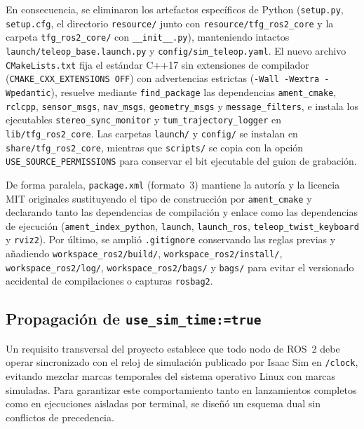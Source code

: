 En consecuencia, se eliminaron los artefactos específicos de Python (\texttt{setup.py}, \texttt{setup.cfg}, el directorio \texttt{resource/} junto con \texttt{resource/tfg\_ros2\_core} y la carpeta \texttt{tfg\_ros2\_core/} con \texttt{\_\_init\_\_.py}), manteniendo intactos \texttt{launch/teleop\_base.launch.py} y \texttt{config/sim\_teleop.yaml}. El nuevo archivo \texttt{CMakeLists.txt} fija el estándar C++17 sin extensiones de compilador (\texttt{CMAKE\_CXX\_EXTENSIONS OFF}) con advertencias estrictas (\texttt{-Wall -Wextra -Wpedantic}), resuelve mediante \texttt{find\_package} las dependencias \texttt{ament\_cmake}, \texttt{rclcpp}, \texttt{sensor\_msgs}, \texttt{nav\_msgs}, \texttt{geometry\_msgs} y \texttt{message\_filters}, e instala los ejecutables \texttt{stereo\_sync\_monitor} y \texttt{tum\_trajectory\_logger} en \texttt{lib/tfg\_ros2\_core}. Las carpetas \texttt{launch/} y \texttt{config/} se instalan en \texttt{share/tfg\_ros2\_core}, mientras que \texttt{scripts/} se copia con la opción \texttt{USE\_SOURCE\_PERMISSIONS} para conservar el bit ejecutable del guion de grabación.

De forma paralela, \texttt{package.xml} (formato~\num{3}) mantiene la autoría y la licencia MIT originales sustituyendo el tipo de construcción por \texttt{ament\_cmake} y declarando tanto las dependencias de compilación y enlace como las dependencias de ejecución (\texttt{ament\_index\_python}, \texttt{launch}, \texttt{launch\_ros}, \texttt{teleop\_twist\_keyboard} y \texttt{rviz2}). Por último, se amplió \texttt{.gitignore} conservando las reglas previas y añadiendo \texttt{workspace\_ros2/build/}, \texttt{workspace\_ros2/install/}, \texttt{workspace\_ros2/log/}, \texttt{workspace\_ros2/bags/} y \texttt{bags/} para evitar el versionado accidental de compilaciones o capturas \texttt{rosbag2}.

\subsection{Propagación de \texttt{use\_sim\_time:=true}}
\label{sec:use_sim_time}

Un requisito transversal del proyecto establece que todo nodo de ROS~2 debe operar sincronizado con el reloj de simulación publicado por Isaac Sim en \texttt{/clock}, evitando mezclar marcas temporales del sistema operativo Linux con marcas simuladas. Para garantizar este comportamiento tanto en lanzamientos completos como en ejecuciones aisladas por terminal, se diseñó un esquema dual sin conflictos de precedencia.

